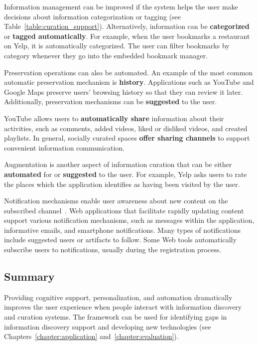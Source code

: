 {{Information management can be improved if the system helps the user make decisions about information categorization or tagging (see Table~\ref{table:curation_support}). Alternatively, information can be \textbf{categorized} or \textbf{tagged automatically}. For example, when the user bookmarks a restaurant on Yelp, it is automatically categorized. The user can filter bookmarks by category whenever they go into the embedded bookmark manager. 

Preservation operations can also be automated. An example of the most common automatic preservation mechanism is \textbf{history}. Applications such as YouTube and Google Maps preserve users' browsing history so that they can review it later. Additionally, preservation mechanisms can be \textbf{suggested} to the user.

\pagebreak

YouTube allows users to \textbf{automatically share} information about their activities, such as comments,  added videos, liked or disliked videos, and created playlists. In general, socially curated spaces \textbf{offer sharing channels} to support convenient information communication.
 
Augmentation is another aspect of information curation that can be either \textbf{automated} for or \textbf{suggested} to the user. For example, Yelp asks users to rate the places which the application identifies as having been visited by the user. 

\pagebreak

Notification mechanisms enable user awareness about new content on the subscribed channel~\cite{millen2005social}. Web applications that facilitate rapidly updating content support various notification mechanisms, such as messages within the application, informative emails, and smartphone notifications. Many types of notifications include suggested users or artifacts to follow. Some Web tools automatically subscribe users to notifications, usually during the registration process.
} %
{\subsection{Summary}
Providing cognitive support, personalization, and automation dramatically improves the user experience when people interact with information discovery and curation systems. The framework can be used for identifying gaps in information discovery support and developing new technologies (see Chapters~\ref{chapter:application} and~\ref{chapter:evaluation}).  
}
}







